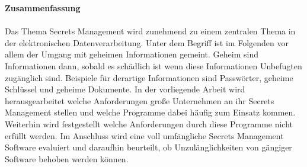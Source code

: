 \documentclass[
book,
a4paper,   
titlepage,  
halfparskip,
12pt        
]{scrartcl}
\begin{document}
%

\thispagestyle{empty}

\large{\textbf{Zusammenfassung}}\\
\\
Das Thema Secrets Management wird zunehmend zu einem zentralen Thema in der
elektronischen Datenverarbeitung.  Unter dem Begriff ist im Folgenden vor
allem der Umgang mit geheimen Informationen gemeint.  Geheim sind
Informationen dann, sobald es schädlich ist wenn diese Informationen
Unbefugten zugänglich sind. Beispiele für derartige Informationen sind
Passwörter, geheime Schlüssel und geheime Dokumente. In der vorliegende Arbeit
wird herausgearbeitet welche Anforderungen große Unternehmen
an ihr Secrets Management stellen und welche Programme dabei häufig zum
Einsatz kommen. Weiterhin wird festgestellt welche
Anforderungen durch diese Programme nicht erfüllt werden. Im Anschluss
wird eine voll umfängliche Secrets Management Software evaluiert und daraufhin beurteilt, 
ob Unzulänglichkeiten von gängiger Software behoben
werden können. 
\end{document}
